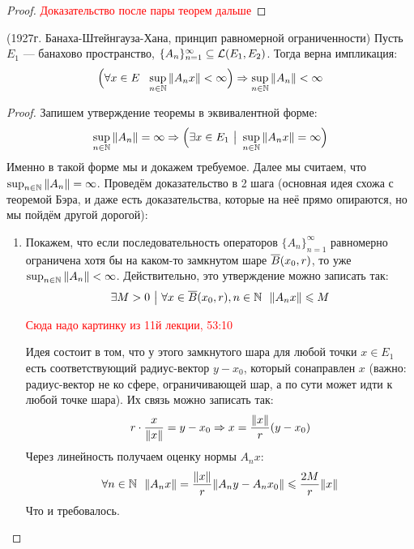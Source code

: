\begin{proof}
	\textcolor{red}{Доказательство после пары теорем дальше}
\end{proof}

\begin{theorem} (1927г. Банаха-Штейнгауза-Хана, принцип равномерной ограниченности)
	Пусть $E_1$ --- банахово пространство, $\{A_n\}_{n = 1}^\infty \subseteq \mathcal{L}(E_1, E_2)$. Тогда верна импликация:
	\[
		\Big(\forall x \in E\ \ \sup_{n \in \mathbb{N}} \|A_n x\| < \infty\Big) \Rightarrow \sup_{n \in \mathbb{N}} \|A_n\| < \infty
	\]
\end{theorem}

\begin{proof}
	Запишем утверждение теоремы в эквивалентной форме:
	\[
		\sup_{n \in \mathbb{N}} \|A_n\| = \infty \Rightarrow \Big(\exists x \in E_1 \ \big|\  \sup_{n \in \mathbb{N}} \|A_nx\| = \infty\Big)
	\]
	Именно в такой форме мы и докажем требуемое. Далее мы считаем, что $\sup_{n \in \mathbb{N}} \|A_n\| = \infty$. Проведём доказательство в 2 шага (основная идея схожа с теоремой Бэра, и даже есть доказательства, которые на неё прямо опираются, но мы пойдём другой дорогой):
	\begin{enumerate}
		\item Покажем, что если последовательность операторов $\{A_n\}_{n = 1}^\infty$ равномерно ограничена хотя бы на каком-то замкнутом шаре $\overline{B}(x_0, r)$, то уже $\sup_{n \in \mathbb{N}} \|A_n\| < \infty$. Действительно, это утверждение можно записать так:
		\[
			\exists M > 0 \ \big|\  \forall x \in \overline{B}(x_0, r), n \in \mathbb{N}\ \ \|A_nx\| \leqslant M
		\]
		
		\textcolor{red}{Сюда надо картинку из 11й лекции, 53:10}
		
		Идея состоит в том, что у этого замкнутого шара для любой точки $x \in E_1$ есть соответствующий радиус-вектор $y - x_0$, который сонаправлен $x$ (важно: радиус-вектор не ко сфере, ограничивающей шар, а по сути может идти к любой точке шара). Их связь можно записать так:
		\[
			r \cdot \frac{x}{\|x\|} = y - x_0 \Rightarrow x = \frac{\|x\|}{r}(y - x_0)
		\]
		Через линейность получаем оценку нормы $A_nx$:
		\[
			\forall n \in \mathbb{N}\ \ \|A_nx\| = \frac{\|x\|}{r}\|A_ny - A_nx_0\| \leqslant \frac{2M}{r}\|x\|
		\]
		Что и требовалось.
		

\end{enumerate}
\end{proof}
